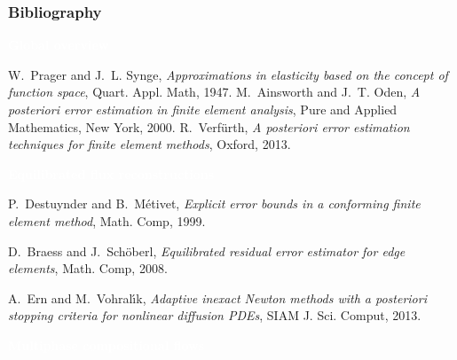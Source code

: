 \documentclass[10 pt]{beamer}
\begin{document}
\begin{frame}
\frametitle{Bibliography}

\vspace{-0.3 cm}
\begin{block}{
\scriptsize{
\textcolor{white}{\textbf{Global overview}}
}}
      \begin{thebibliography}{10}
\scriptsize{
{\sc W.~Prager and J.~L. Synge}, {\em Approximations in elasticity based on the
  concept of function space}, Quart. Appl. Math, 1947.
{\sc M.~Ainsworth and J.~T. Oden}, {\em A posteriori error estimation in finite element analysis}, Pure and Applied Mathematics, New York, 2000.
{\sc R.~Verf\"urth}, {\em A posteriori error estimation techniques for finite
  element methods}, Oxford, 2013.}
\end{thebibliography}
\end{block}
   
   \vspace{-0.2 cm}
\begin{block}{
\scriptsize{
\textcolor{white}{\textbf{Equilibrated flux reconstructions}}
}}

     \begin{thebibliography}{10}
\scriptsize{ 
{\sc P.~Destuynder and B.~M\'etivet}, {\em Explicit error bounds in a
  conforming finite element method}, Math. Comp, 1999.

{\sc D.~Braess and J.~Sch\"oberl}, {\em Equilibrated residual error estimator
  for edge elements}, Math. Comp, 2008.

{\sc A.~Ern and M.~Vohral{\'{\i}}k}, {\em Adaptive inexact {N}ewton methods
  with a posteriori stopping criteria for nonlinear diffusion {PDE}s}, SIAM J.
  Sci. Comput, 2013.
}
\end{thebibliography}
\end{block}
\vspace{-0.1 cm}
\begin{block}{
\scriptsize{
\textcolor{white}{\textbf{Multiphase compositional flows}}
}}
\hspace{-0.7 cm}


\end{block}
\end{frame}
\end{document}
